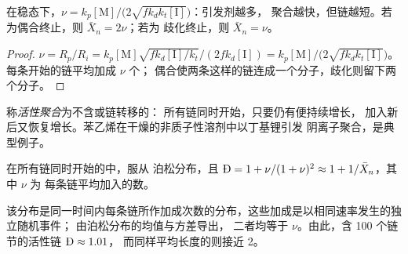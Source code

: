 \begin{proposition}[链长与引发剂]\label{prop:b2:polymer-synthesis:chain-length}
在稳态下，$\nu = k_p[\mathrm M]/\bigl(2\sqrt{fk_dk_t[\mathrm I]}\bigr)$：引发剂越多，
聚合越快，但链越短。若为偶合终止，则 $\bar X_n = 2\nu$；若为
歧化终止，则 $\bar X_n = \nu$。
\end{proposition}

\begin{proof}
$\nu = R_p/R_i = k_p[\mathrm M]\sqrt{fk_d[\mathrm I]/k_t}/(2fk_d[\mathrm I]) =
k_p[\mathrm M]/\bigl(2\sqrt{fk_dk_t[\mathrm I]}\bigr)$。每条开始的链平均加成 $\nu$ 个；
偶合使两条这样的链连成一个分子，歧化则留下两个分子。
\end{proof}

\begin{definition}[活性聚合]\label{def:b2:polymer-synthesis:living}
称\emph{活性聚合}为不含或链转移的：
所有链同时开始，只要仍有便持续增长，
加入新后又恢复增长。苯乙烯在干燥的非质子性溶剂中以丁基锂引发
阴离子聚合，是典型例子。
\end{definition}

\begin{proposition}[窄分布]\label{prop:b2:polymer-synthesis:living}
在所有链同时开始的中，服从
泊松分布，且 $\text{\DH} = 1 + \nu/(1+\nu)^2 \approx 1 + 1/\bar X_n$，其中 $\nu$ 为
每条链平均加入的数。
\end{proposition}

\admitted

该分布是同一时间内每条链所作加成次数的分布，这些加成是以相同速率发生的独立随机事件；
由泊松分布的均值与方差导出，
二者均等于 $\nu$。由此，含 100 个链节的活性链 $\text{\DH} \approx 1.01$，
而同样平均长度的则接近 2。

